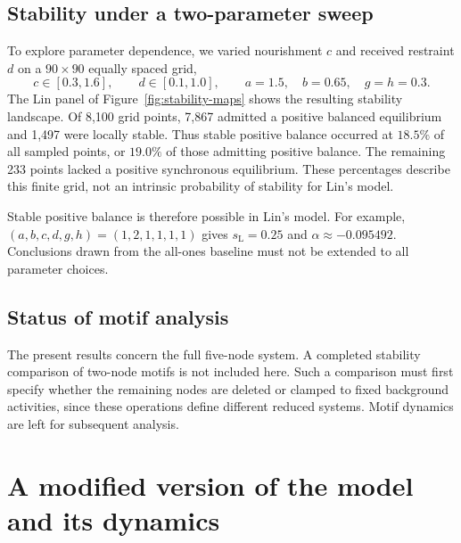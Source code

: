 \documentclass{article}
\begin{document}
\subsection{Stability under a two-parameter sweep}
To explore parameter dependence, we varied nourishment $c$ and received
restraint $d$ on a $90\times90$ equally spaced grid,
\begin{equation}
 c\in[0.3,1.6],\qquad d\in[0.1,1.0],\qquad
 a=1.5,\quad b=0.65,\quad g=h=0.3.
 \label{eq:lin-sweep}
\end{equation}
The Lin panel of Figure~\ref{fig:stability-maps} shows the resulting
stability landscape. Of 8,100 grid points, 7,867 admitted a positive balanced
equilibrium and 1,497 were locally stable. Thus stable positive balance
occurred at $18.5\%$ of all sampled points, or $19.0\%$ of those admitting
positive balance. The remaining 233 points lacked a positive synchronous
equilibrium. These percentages describe this finite grid, not an intrinsic
probability of stability for Lin's model.

Stable positive balance is therefore possible in Lin's model. For example,
$(a,b,c,d,g,h)=(1,2,1,1,1,1)$ gives $s_{\mathrm L}=0.25$ and
$\alpha\approx-0.095492$. Conclusions drawn from the all-ones baseline
must not be extended to all parameter choices.

\subsection{Status of motif analysis}
The present results concern the full five-node system. A completed stability
comparison of two-node motifs is not included here. Such a comparison must
first specify whether the remaining nodes are deleted or clamped to fixed
background activities, since these operations define different reduced
systems. Motif dynamics are left for subsequent analysis.

\section{A modified version of the model and its dynamics}
\label{sec:modified-results}
\end{document}
